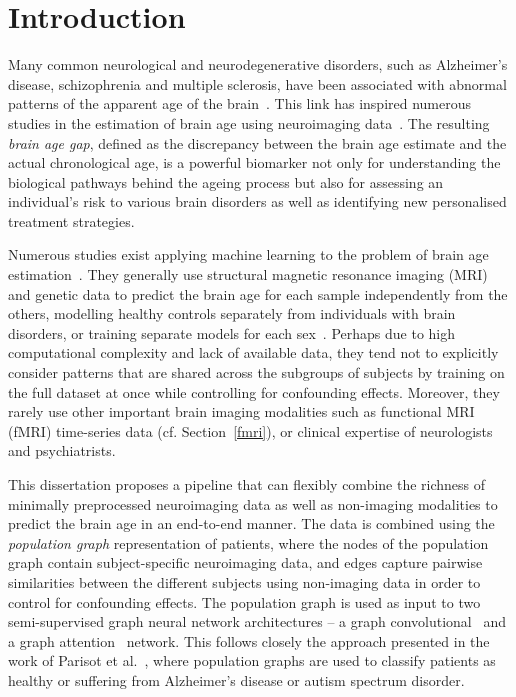 \chapter{Introduction}



Many common neurological and neurodegenerative disorders, such as Alzheimer’s disease, schizophrenia and multiple sclerosis, have been associated with abnormal patterns of the apparent age of the brain~\cite{kaufmann2019}. This link has inspired numerous studies in the estimation of brain age using neuroimaging data~\cite{franke2019ten}. The resulting \textit{brain age gap}, defined as the discrepancy between the brain age estimate and the actual chronological age, is a powerful biomarker not only for understanding the biological pathways behind the ageing process but also for assessing an individual’s risk to various brain disorders as well as identifying new personalised treatment strategies.


Numerous studies exist applying machine learning to the problem of brain age estimation~\cite{franke2019ten}. They generally use structural magnetic resonance imaging (MRI) and genetic data to predict the brain age for each sample independently from the others, modelling healthy controls separately from individuals with brain disorders, or training separate models for each sex~\cite{kaufmann2019,niu2019improved}. Perhaps due to high computational complexity and lack of available data, they tend not to explicitly consider patterns that are shared across the subgroups of subjects by training on the full dataset at once while controlling for confounding effects. Moreover, they rarely use other important brain imaging modalities such as functional MRI (fMRI) time-series data (cf. Section~\ref{fmri}), or clinical expertise of neurologists and psychiatrists.


This dissertation proposes a pipeline that can flexibly combine the richness of minimally preprocessed neuroimaging data as well as non-imaging modalities to predict the brain age in an end-to-end manner. The data is combined using the \textit{population graph} representation of patients, where the nodes of the population graph contain subject-specific neuroimaging data, and edges capture pairwise similarities between the different subjects using non-imaging data in order to control for confounding effects. The population graph is used as input to two semi-supervised graph neural network architectures – a graph convolutional~\cite{kipf2017semi} and a graph attention~\cite{velickovic2018graph} network. This follows closely the approach presented in the work of Parisot et al.~\cite{parisot2017spectral,parisot2018disease}, where population graphs are used to classify patients as healthy or suffering from Alzheimer's disease or autism spectrum disorder.

